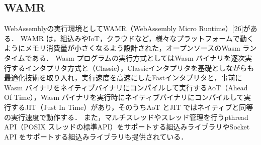 \subsection*{WAMR}
WebAssemblyの実行環境としてWAMR（WebAssembly Micro Runtime）[26]がある．
WAMR は，組込みやIoT，クラウドなど，様々なプラットフォームで動くようにメモリ消費量が小さくなるよう設計された，オープンソースのWasm ランタイムである．
Wasm プログラムの実行方式としてはWasm バイナリを逐次実行するインタプリタ方式と（Classic），Classicインタプリタを基礎としながらも最適化技術を取り入れ，実行速度を高速にしたFastインタプリタと，事前にWasm バイナリをネイティブバイナリにコンパイルして実行するAoT（Ahead Of Time），Wasm バイナリを実行時にネイティブバイナリにコンパイルして実行するJIT（Just In Time）があり，そのうちAoT とJIT ではネイティブと同等の実行速度で動作する．
また，マルチスレッドやスレッド管理を行うpthread API（POSIX スレッドの標準API）をサポートする組込みライブラリやSocket API をサポートする組込みライブラリも提供されている．
